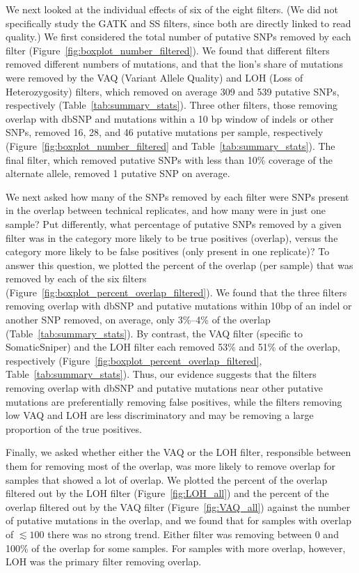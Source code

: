 \documentclass[11pt]{article} %
\begin{document}
We next looked at the individual effects of six of the eight filters. (We did not specifically study the GATK and SS filters, since both are directly linked to read quality.) We first considered the total number of putative SNPs removed by each filter (Figure~\ref{fig:boxplot_number_filtered}). We found that different filters removed different numbers of mutations, and that the lion's share of mutations were removed by the VAQ (Variant Allele Quality) and LOH (Loss of Heterozygosity) filters, which removed on average 309 and 539 putative SNPs, respectively (Table~\ref{tab:summary_stats}). Three other filters, those removing overlap with dbSNP and mutations within a 10 bp window of indels or other SNPs, removed 16, 28, and 46 putative mutations per sample, respectively (Figure~\ref{fig:boxplot_number_filtered} and Table~\ref{tab:summary_stats}). The final filter, which removed putative SNPs with less than 10\% coverage of the alternate allele, removed 1 putative SNP on average. 

We next asked how many of the SNPs removed by each filter were SNPs present in the overlap between technical replicates, and how many were in just one sample? Put differently, what percentage of putative SNPs removed by a given filter was in the category more likely to be true positives (overlap), versus the category more likely to be false positives (only present in one replicate)? To answer this question, we plotted the percent of the overlap (per sample) that was removed by each of the six filters (Figure~\ref{fig:boxplot_percent_overlap_filtered}). We found that the three filters removing overlap with dbSNP and putative mutations within 10bp of an indel or another SNP removed, on average, only 3\%--4\% of the overlap (Table~\ref{tab:summary_stats}). By contrast, the VAQ filter (specific to SomaticSniper) and the LOH filter each removed 53\% and 51\% of the overlap, respectively (Figure~\ref{fig:boxplot_percent_overlap_filtered}, Table~\ref{tab:summary_stats}). Thus, our evidence suggests that the filters removing overlap with dbSNP and putative mutations near other putative mutations are preferentially removing false positives, while the filters removing low VAQ and LOH are less discriminatory and may be removing a large proportion of the true positives. 

Finally, we asked whether either the VAQ or the LOH filter, responsible between them for removing most of the overlap, was more likely to remove overlap for samples that showed a lot of overlap. We plotted the percent of the overlap filtered out by the LOH filter (Figure~\ref{fig:LOH_all}) and the percent of the overlap filtered out by the VAQ filter (Figure~\ref{fig:VAQ_all}) against the number of putative mutations in the overlap, and we found that for samples with overlap of $\lesssim 100$ there was no strong trend. Either filter was removing between 0 and 100\% of the overlap for some samples. For samples with more overlap, however, LOH was the primary filter removing overlap.   
\end{document}
